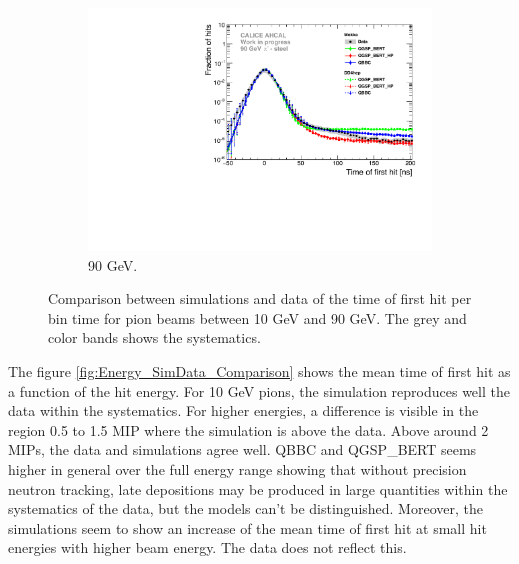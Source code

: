 \begin{figure}[htbp!]
\begin{subfigure}[t]{0.5\textwidth}
		\includegraphics[width=1\textwidth]{chap5/fig_AHCAL_timing/Pions/Comparison_SimData_Pion90GeV_LateClusters.pdf}
		\caption{90 GeV.} \label{fig:dNdt_SimData_90GeV}
	\end{subfigure}
	\caption{Comparison between simulations and data of the time of first hit per bin time for pion beams between 10 GeV and 90 GeV. The grey and color bands shows the systematics.}
	\label{fig:dNdt_SimData_Comparison}
\end{figure}

The figure \ref{fig:Energy_SimData_Comparison} shows the mean time of first hit as a function of the hit energy. For 10 GeV pions, the simulation reproduces well the data within the systematics. For higher energies, a difference is visible in the region 0.5 to 1.5 MIP where the simulation is above the data. Above around 2 MIPs, the data and simulations agree well. QBBC and QGSP\_BERT seems higher in general over the full energy range showing that without precision neutron tracking, late depositions may be produced in large quantities within the systematics of the data, but the models can't be distinguished.
Moreover, the simulations seem to show an increase of the mean time of first hit at small hit energies with higher beam energy. The data does not reflect this.

